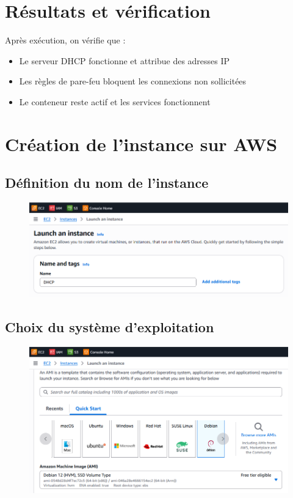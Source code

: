	\section{Résultats et vérification}
	Après exécution, on vérifie que :
	\begin{itemize}
		\item Le serveur DHCP fonctionne et attribue des adresses IP
		\item Les règles de pare-feu bloquent les connexions non sollicitées
		\item Le conteneur reste actif et les services fonctionnent
	\end{itemize}

 \section{Création de l’instance sur AWS}

\vspace{1em}
 \subsection{Définition du nom de l’instance}
\begin{figure}[h!]
	\centering
	\includegraphics[width=0.8\linewidth]{corps/images/image1}
	\label{fig:1}
\end{figure}

\subsection{Choix du système d’exploitation}
	\begin{figure}[h!]
		\centering
		\includegraphics[width=0.8\linewidth]{corps/images/image2}
		\label{fig:2}
	\end{figure}

